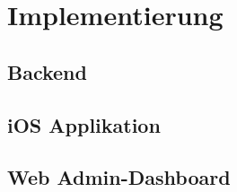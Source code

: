 \chapter{Implementierung}

\section{Backend}

\section{iOS Applikation}

\section{Web Admin-Dashboard}